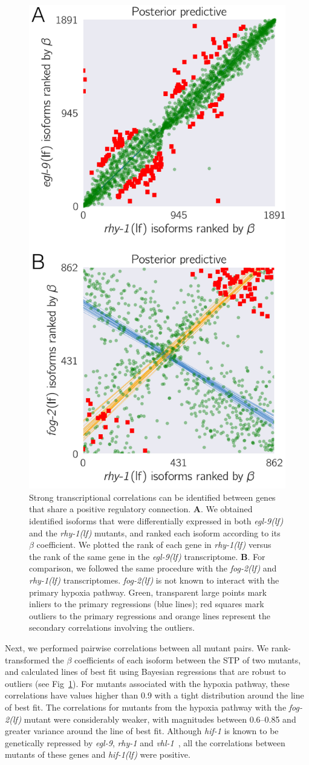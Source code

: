 \documentclass[9pt,twocolumn,twoside]{pnas-new}
\newcommand{\gene}[1]{\mbox{\emph{#1}}}
\newcommand{\fog}{\gene{fog-2(lf)}}
\newcommand{\egl}{\gene{egl-9(lf)}}
\newcommand{\rhy}{\gene{rhy-1(lf)}}
\newcommand{\hif}{\gene{hif-1(lf)}}
\begin{document}
\begin{figure}[tbhp]
  \centering
  \includegraphics[width=.4\textwidth]{../figs/positive_and_control.pdf}
  \caption{
    Strong transcriptional correlations can be identified between genes that
    share a positive regulatory connection.
    \textbf{A}. We obtained identified
    isoforms that were differentially expressed in both \egl{} and the \rhy{}
    mutants, and ranked each isoform according to its $\beta$ coefficient. We
    plotted the rank of each gene in \rhy{} versus the rank of the same gene in
    the \egl{} transcriptome.
    \textbf{B}. For comparison, we followed the same
    procedure with the \fog{} and \rhy{} transcriptomes. \fog{} is not known to
    interact with the primary hypoxia pathway.
    Green, transparent large points
    mark inliers to the primary regressions (blue lines); red squares mark
    outliers to the primary regressions and orange lines represent the secondary
    correlations involving the outliers.
  }
\label{fig:genetic_interactions}
\end{figure}

Next, we performed pairwise correlations between all mutant pairs. We
rank-transformed the $\beta$ coefficients of each isoform between the STP of two
mutants, and calculated lines of best fit using Bayesian regressions that are
robust to outliers (see Fig~\ref{fig:genetic_interactions}). For mutants
associated with the hypoxia pathway, these correlations have values higher than
0.9 with a tight distribution around the line of best fit. The correlations for
mutants from the hypoxia pathway with the \fog{} mutant were considerably
weaker, with magnitudes between 0.6--0.85 and greater variance around the line
of best fit. Although \gene{hif-1} is known to be genetically repressed by
\gene{egl-9}, \gene{rhy-1} and \gene{vhl-1}~\cite{Epstein2001,Shen2006}, all the
correlations between mutants of these genes and \hif{} were positive.
\end{document}

